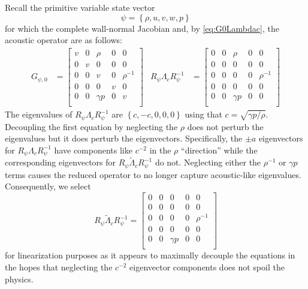 \documentclass[letterpaper,11pt,nointlimits,reqno]{amsart}
\begin{document}
Recall the primitive variable state vector
\begin{equation}
  \psi = \left\{\rho, u, v, w, p\right\}
\end{equation}
for which the complete wall-normal Jacobian and, by \eqref{eq:G0Lambdac}, the
acoustic operator are as follows:
\begin{align}
 G_{\psi,0} &=
 \begin{bmatrix}
   v  &  0  &  \rho       & 0 &  0          \\
   0  &  v  &  0          & 0 &  0          \\
   0  &  0  &  v          & 0 &  \rho^{-1}  \\
   0  &  0  &  0          & v &  0          \\
   0  &  0  &  \gamma{}p  & 0 &  v          \\
 \end{bmatrix}
&
 R_\psi \Lambda_c R_\psi^{-1} &=
 \begin{bmatrix}
   0  &  0  &  \rho       & 0 &  0          \\
   0  &  0  &  0          & 0 &  0          \\
   0  &  0  &  0          & 0 &  \rho^{-1}  \\
   0  &  0  &  0          & 0 &  0          \\
   0  &  0  &  \gamma{}p  & 0 &  0          \\
 \end{bmatrix}
\end{align}
The eigenvalues of $R_\psi \Lambda_c R_\psi^{-1}$ are $\left\{c, -c, 0, 0,
0\right\}$ using that $c=\sqrt{\gamma p / \rho}$.  Decoupling the first
equation by neglecting the $\rho$ does not perturb the eigenvalues but it
does perturb the eigenvectors.  Specifically, the $\pm{}a$ eigenvectors
for $R_\psi \Lambda_c R_\psi^{-1}$ have components like $c^{-2}$ in the $\rho$
``direction'' while the corresponding eigenvectors for $R_\psi \tilde\Lambda_c
R_\psi^{-1}$ do not.  Neglecting either the $\rho^{-1}$ or $\gamma p$ terms
causes the reduced operator to no longer capture acoustic-like eigenvalues.
Consequently, we select
\begin{equation}\label{eq:approxprim}
 R_\psi \tilde\Lambda_c R_\psi^{-1} =
 \begin{bmatrix}
   0  &  0  &  0          & 0 &  0          \\
   0  &  0  &  0          & 0 &  0          \\
   0  &  0  &  0          & 0 &  \rho^{-1}  \\
   0  &  0  &  0          & 0 &  0          \\
   0  &  0  &  \gamma{}p  & 0 &  0          \\
 \end{bmatrix}
\end{equation}
for linearization purposes as it appears to maximally decouple the equations in
the hopes that neglecting the $c^{-2}$ eigenvector components does not spoil
the physics.
\end{document}
